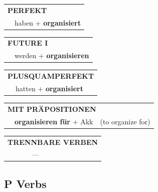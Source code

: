 \documentclass[10pt,a4paper]{revtex4-2}
\begin{document}
\begin{verbbox-acc}
\vspace{10pt}

\begin{tabular}{rl}
\multicolumn{2}{l}{\textbf{PERFEKT}}\\
& haben + \textbf{organisiert}\\
\end{tabular}
\hfill
\begin{tabular}{rl}
\multicolumn{2}{l}{\textbf{FUTURE I}}\\
& werden + \textbf{organisieren}\\
\end{tabular}
\hfill
\begin{tabular}{rl}
\multicolumn{2}{l}{\textbf{PLUSQUAMPERFEKT}}\\
& hatten + \textbf{organisiert}\\
\end{tabular}

\vspace{10pt}

\begin{tabular}{lll}
\multicolumn{3}{l}{\textbf{MIT PRÄPOSITIONEN}}\\
& \textbf{organisieren für} + Akk & (to organize for)\\
\end{tabular}
\hfill
\begin{tabular}{lll}
\multicolumn{3}{l}{\textbf{TRENNBARE VERBEN}}\\
& ---\\
\end{tabular}

\vspace{-5pt}
\end{verbbox-acc}

\subsection{P Verbs}
\end{document}
